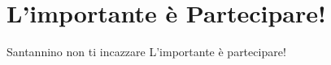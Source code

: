 \section{L'importante è Partecipare!}
\begin{canzone}
Santannino non ti incazzare
L'importante è partecipare!
\end{canzone}
